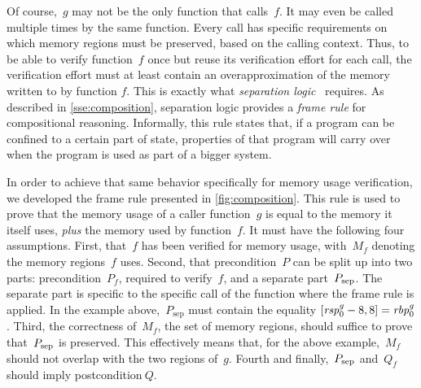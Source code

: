 Of course,~$g$ may not be the only function that calls~$f$.
It may even be called multiple times by the same function.
Every call has specific requirements on which memory regions must be preserved,%
%
%
based on the calling context.
Thus, to be able to verify function~$f$ once
but reuse its verification effort for each call,%
the verification effort must at least contain an overapproximation of the memory written to by function $f$.
This is exactly what \emph{separation
logic}~\citep{o2001local,reynolds2002separation,krebbers2017essence}%
requires.
As described in \cref{sse:composition},
separation logic provides a \emph{frame rule} for compositional reasoning.%
Informally, this rule states that, if a program can be confined
to a certain part of state, properties of that program will carry over
when the program is used as part of a bigger system.

In order to achieve that same behavior specifically for memory usage verification,%
we developed the frame rule presented in \cref{fig:composition}.
This rule is used to prove that the memory usage of a caller function~$g$
is equal to the memory it itself uses, \emph{plus} the memory used by function~$f$.
It must have the following four assumptions.
First, that~$f$ has been verified for memory usage,
with~$M_f$ denoting the memory regions~$f$ uses.%
Second, that precondition~$P$ can be split up into two parts:%
precondition~$P_f$, required to verify~$f$, and a separate part~$\psep$.
The separate part is specific to the specific call of the function
where the frame rule is applied.%
In the example above,~$P_\mathrm{sep}$ must contain the equality
$\region{\rspo^g-8}{8}=\rbpo^g$.
Third, the correctness of~$M_f$, the set of memory regions,
should suffice to prove that~$\psep$ is preserved.
This effectively means that, for the above example,~$M_f$
should not overlap with the two regions of~$g$.
Fourth and finally,~$\psep$ and~$Q_f$ should imply postcondition$~Q$.
\begin{figure*}
  \begin{prooftree}
  \end{prooftree}
  \caption{Frame rule for composition of memory usage}\label{fig:composition}
\end{figure*}

